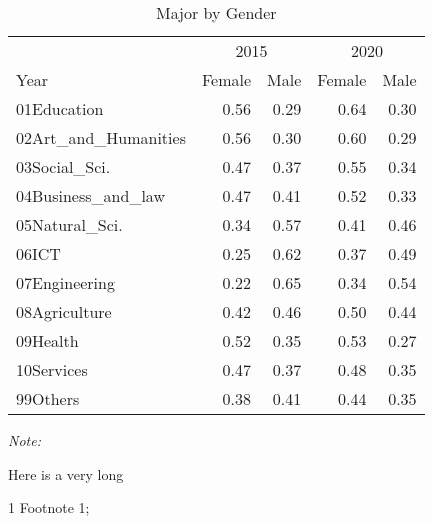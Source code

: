 \begin{table}
\centering
\caption{Major by Gender}
\centering
\begin{threeparttable}
\begin{tabular}[t]{lrrrr}
\toprule
\multicolumn{1}{c}{ } & \multicolumn{2}{c}{2015} & \multicolumn{2}{c}{2020} \\
\cmidrule(l{3pt}r{3pt}){2-3} \cmidrule(l{3pt}r{3pt}){4-5}
Year & Female & Male & Female & Male\\
\midrule
01Education & 0.56 & 0.29 & 0.64 & 0.30\\
02Art\_and\_Humanities & 0.56 & 0.30 & 0.60 & 0.29\\
03Social\_Sci. & 0.47 & 0.37 & 0.55 & 0.34\\
04Business\_and\_law & 0.47 & 0.41 & 0.52 & 0.33\\
05Natural\_Sci. & 0.34 & 0.57 & 0.41 & 0.46\\
\addlinespace
06ICT & 0.25 & 0.62 & 0.37 & 0.49\\
07Engineering & 0.22 & 0.65 & 0.34 & 0.54\\
08Agriculture & 0.42 & 0.46 & 0.50 & 0.44\\
09Health & 0.52 & 0.35 & 0.53 & 0.27\\
10Services & 0.47 & 0.37 & 0.48 & 0.35\\
\addlinespace
99Others & 0.38 & 0.41 & 0.44 & 0.35\\
\bottomrule
\end{tabular}
\begin{tablenotes}
\item \textit{Note: } 
\item Here is a very long
\item[1] Footnote 1; 
\end{tablenotes}
\end{threeparttable}
\end{table}

